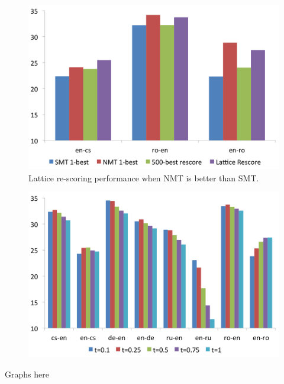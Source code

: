 \documentclass[landscape]{jhuslides3C}
\begin{document}
\begin{figure}
\begin{center}
\includegraphics[scale=0.7]{images/nmtBetter.png}
\caption{Lattice re-scoring performance when NMT is better than SMT.}
\end{center}
\end{figure}

\begin{figure}
\begin{center}
\includegraphics[scale=0.7]{images/thresholds.png}
\caption{}
\end{center}
\end{figure}

Graphs here
\end{document}
